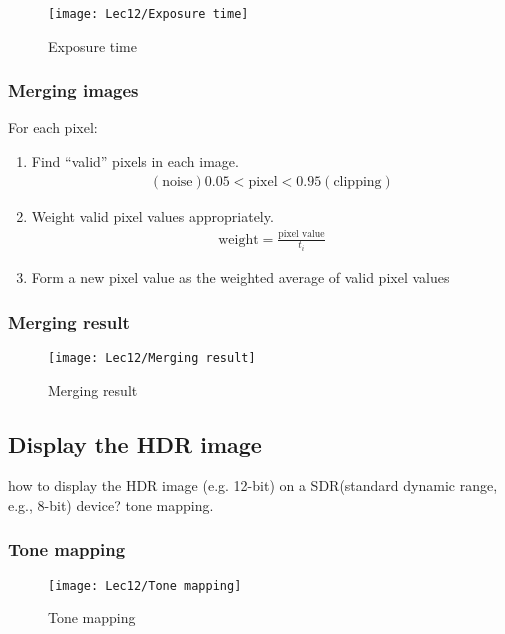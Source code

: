 \begin{figure}[H]
    \centering
    \texttt{[image: Lec12/Exposure time]}
    \caption{Exposure time}
\end{figure}



\subsubsection{Merging images}
For each pixel:
\begin{enumerate}
    \item Find “valid” pixels in each image. 
    \begin{align*}
        (\text{noise})0.05<\text{pixel}<0.95(\text{clipping})
    \end{align*}
    \item Weight valid pixel values appropriately. 
    \begin{align*}
        \text{weight}=\frac{\text{pixel value}}{t_i}
    \end{align*}
    \item Form a new pixel value as the weighted average of valid pixel values
\end{enumerate}

\subsubsection{Merging result}

\begin{figure}[H]
    \centering
    \texttt{[image: Lec12/Merging result]}
    \caption{Merging result}
\end{figure}

\subsection{Display the HDR image}
how to display the HDR image (e.g. 12-bit) on a SDR(standard dynamic range, e.g., 8-bit) device? tone mapping. 

\subsubsection{Tone mapping}

\begin{figure}[H]
    \centering
    \texttt{[image: Lec12/Tone mapping]}
    \caption{Tone mapping}
\end{figure}

